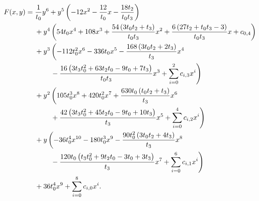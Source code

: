 \begin{align}
    \label{curve:dilute_vacant}
    F(x,y)={} & \frac{1}{t_0}y^{6}{}+y^{5}\left(-12x^{2} - \frac{12}{t_0}x - \frac{18 t_2}{t_0 t_3}\right)\notag \\
              & {}+y^{4}\left(54 t_0x^{4} + 108x^{3} + \frac{54 \left(3 t_0 t_2+t_3\right)}{t_0 t_3}x^{2} + \frac{6 \left(27 t_2+t_0 t_3-3\right)}{t_0 t_3}x + c_{0,4}\right)\notag \\
              & {}+y^{3}\left(-112 t_0^2x^{6} - 336 t_0x^{5} - \frac{168 \left(3 t_0 t_2+2 t_3\right)}{t_3}x^{4}\right.\notag \\*
              & \qquad{}\left.{}- \frac{16 \left(3 t_3 t_0^2+63 t_2 t_0-9 t_0+7 t_3\right)}{t_0 t_3}x^{3} + \sum_{i=0}^{2}c_{i,3}x^i\right)\notag \\
              & {}+y^{2}\left(105 t_0^3x^{8} + 420 t_0^2x^{7} + \frac{630 t_0 \left(t_0 t_2+t_3\right)}{t_3}x^{6}\right.\notag \\*
              & \qquad{}\left.{}+ \frac{42 \left(3 t_3 t_0^2+45 t_2 t_0-9 t_0+10 t_3\right)}{t_3}x^{5} + \sum_{i=0}^{4}c_{i,2}x^i\right)\notag \\
              & {}+y\left(-36 t_0^4x^{10} - 180 t_0^3x^{9} - \frac{90 t_0^2 \left(3 t_0 t_2+4 t_3\right)}{t_3}x^{8}\right.\notag \\*
              & \qquad{}\left.{}- \frac{120 t_0 \left(t_3 t_0^2+9 t_2 t_0-3 t_0+3 t_3\right)}{t_3}x^{7} + \sum_{i=0}^{6}c_{i,1}x^i\right)\notag \\
              & {}+36 t_0^4x^{9} + \sum_{i=0}^{8}c_{i,0}x^i.
\end{align}
